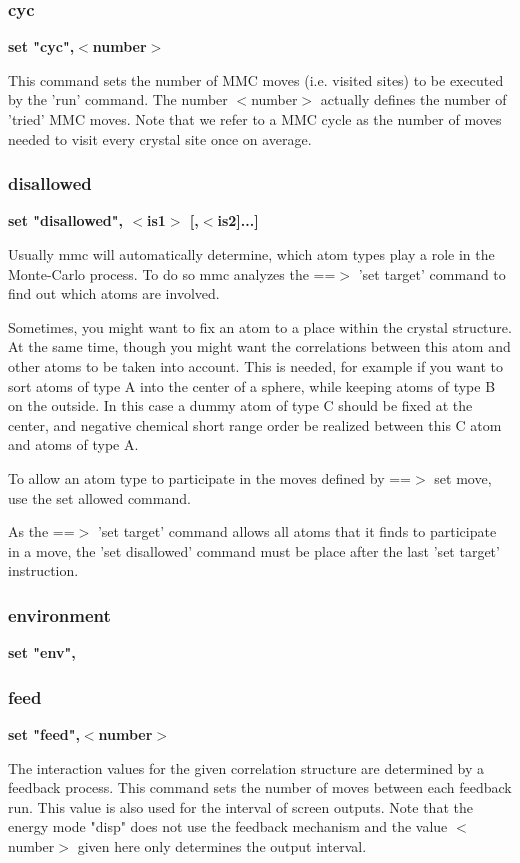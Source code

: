 \subsubsection{cyc}
{\bf set "cyc",$ <$number$> $ \par }
\par
\vspace{3pt}
This command sets the number of MMC moves (i.e. visited sites) to 
be executed by the 'run' command. The number $ <$number$> $ actually 
defines the number of 'tried' MMC moves. Note that we refer to a 
MMC cycle as the number of moves needed to visit every crystal site 
once on average. 
\subsubsection{disallowed}
{\bf set "disallowed", $ <$is1$> $ [,$ <$is2]...] \par }
\par
\vspace{3pt}
Usually mmc will automatically determine, which atom types play 
a role in the Monte-Carlo process. To do so mmc analyzes the 
==$> $ 'set target' command to find out which atoms are involved. 
\par
Sometimes, you might want to fix an atom to a place within the 
crystal structure. At the same time, though you might want the 
correlations between this atom and other atoms to be taken into 
account. This is needed, for example if you want to sort atoms 
of type A into the center of a sphere, while keeping atoms of type 
B on the outside. In this case a dummy atom of type C should be 
fixed at the center, and negative chemical short range order 
be realized between this C atom and atoms of type A. 
\par
To allow an atom type to participate in the moves defined 
by ==$> $ set move, use the set allowed command. 
\par
As the ==$> $ 'set target' command allows all atoms that it finds 
to participate in a move, the 'set disallowed' command must be 
place after the last 'set target' instruction. 
\subsubsection{environment}
{\bf set "env", \par }
\par
\subsubsection{feed}
{\bf set "feed",$ <$number$> $ \par }
\par
\vspace{3pt}
The interaction values for the given correlation structure are 
determined by a feedback process. This command sets the number 
of moves between each feedback run. This value is also used for 
the interval of screen outputs. Note that the energy mode "disp" 
does not use the feedback mechanism and the value $ <$number$> $ given 
here only determines the output interval. 
\par
